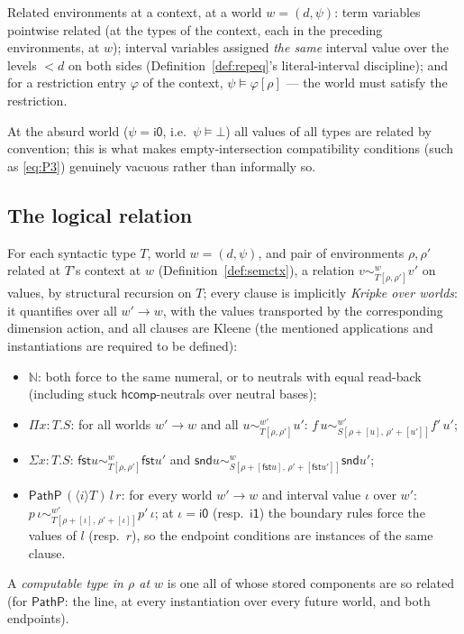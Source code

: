 \documentclass{lmcs}
\newcommand{\hcomp}{\mathsf{hcomp}}
\providecommand{\fst}{}\renewcommand{\fst}{\mathsf{fst}}
\providecommand{\snd}{}\renewcommand{\snd}{\mathsf{snd}}
\newcommand{\ii}{\mathsf{i1}}
\newcommand{\io}{\mathsf{i0}}
\begin{document}
\begin{defi}\label{def:semctx}
  Related environments at a context, at a world $w = (d, \psi)$:
  term variables pointwise related (at the types of the context,
  each in the preceding environments, at $w$); interval variables
  assigned \emph{the same} interval value over the levels $< d$ on
  both sides (Definition~\ref{def:repeq}'s literal-interval
  discipline); and for a restriction entry $\varphi$ of the
  context, $\psi \models \varphi[\rho]$ --- the world must satisfy
  the restriction.
\end{defi}

At the absurd world ($\psi = \io$, i.e.\ $\psi \models \bot$) all
values of all types are related by convention; this is what makes
empty-intersection compatibility conditions (such as
\eqref{eq:P3}) genuinely vacuous rather than informally so.

\subsection{The logical relation}
\label{app:corerel}

For each syntactic type $T$, world $w = (d, \psi)$, and pair of
environments $\rho, \rho'$ related at $T$'s context at $w$
(Definition~\ref{def:semctx}), a relation
$v \sim^w_{T[\rho,\rho']} v'$ on values, by structural recursion on
$T$; every clause is implicitly \emph{Kripke over worlds}: it
quantifies over all $w' \to w$, with the values transported by the
corresponding dimension action, and all clauses are Kleene (the
mentioned applications and instantiations are required to be
defined):

\begin{itemize}
\item $\mathbb{N}$: both force to the same numeral, or to neutrals
  with equal read-back (including stuck $\hcomp$-neutrals over
  neutral bases);
\item $\Pi x{:}T.S$: for all worlds $w' \to w$ and all
  $u \sim^{w'}_{T[\rho,\rho']} u'$:
  $f\,u \sim^{w'}_{S[\rho+[u],\, \rho'+[u']]} f'\,u'$;
\item $\Sigma x{:}T.S$: $\fst u \sim^w_{T[\rho,\rho']} \fst u'$
  and
  $\snd u \sim^w_{S[\rho+[\fst u],\, \rho'+[\fst u']]} \snd u'$;
\item $\mathsf{PathP}\,(\langle i \rangle T)\,l\,r$: for every
  world $w' \to w$ and interval value $\iota$ over $w'$:
  $p\,\iota \sim^{w'}_{T[\rho+[\iota],\, \rho'+[\iota]]} p'\,\iota$;
  at $\iota = \io$ (resp.\ $\ii$) the boundary rules force the
  values of $l$ (resp.\ $r$), so the endpoint conditions are
  instances of the same clause.
\end{itemize}
A \emph{computable type in $\rho$ at $w$} is one all of whose
stored components are so related (for $\mathsf{PathP}$: the line,
at every instantiation over every future world, and both
endpoints).
\end{document}
